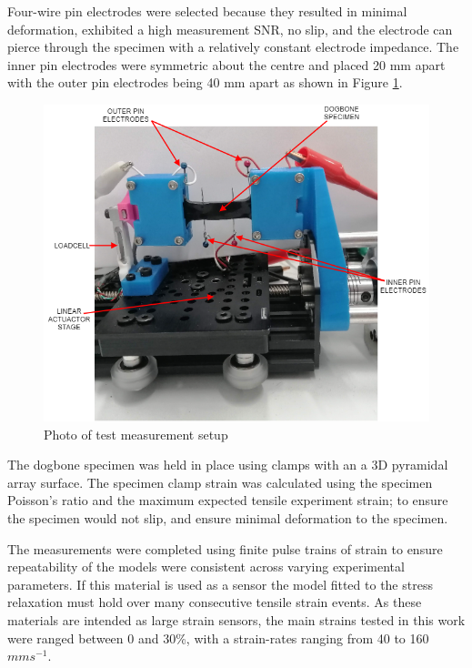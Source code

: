 Four-wire pin electrodes were selected because they resulted in minimal deformation, exhibited a high measurement SNR, no slip, and the electrode can pierce through the specimen with a relatively constant electrode impedance. The inner pin electrodes were symmetric about the centre and placed 20 mm apart with the outer pin electrodes being 40 mm apart as shown in Figure \ref{fig:electromech-setup}.
\begin{figure}[H]
	\centering
	\includegraphics[width=0.7\linewidth]{Figures/ELECTROMECH-SETUP.png}
	\caption{Photo of test measurement setup}
	\label{fig:electromech-setup}
\end{figure}
The dogbone specimen was held in place using clamps with an a 3D pyramidal array surface. 
The specimen clamp strain was calculated using the specimen Poisson's ratio and the maximum expected tensile experiment strain; to ensure the specimen would not slip, and ensure minimal deformation to the specimen.
  
The measurements were completed using finite pulse trains of strain to ensure repeatability of the models were consistent across varying experimental parameters. If this material is used as a sensor the model fitted to the stress relaxation must hold over many consecutive tensile strain events. As these materials are intended as large strain sensors, the main strains tested in this work were ranged between 0 and 30\%, with a strain-rates ranging from 40 to 160 $mms^{-1}$.

